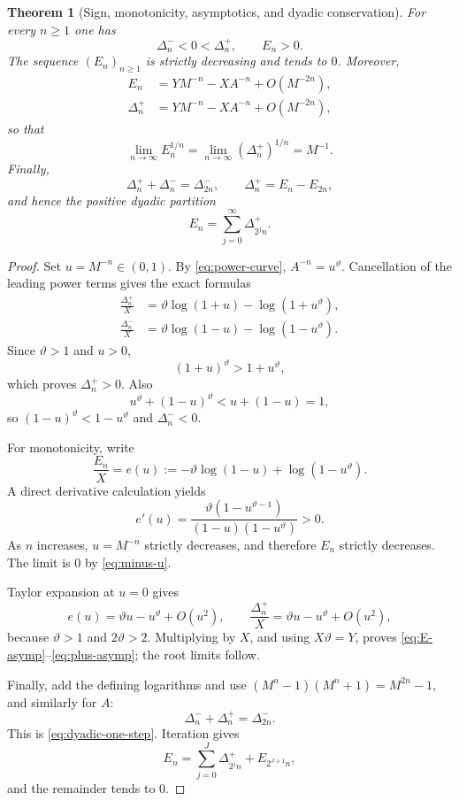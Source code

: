 \documentclass[11pt]{article}
\newtheorem{theorem}{Theorem}[section]
\theoremstyle{definition}
\newcommand{\vtheta}{\vartheta}
\begin{document}
\begin{theorem}[Sign, monotonicity, asymptotics, and dyadic conservation]
\label{thm:shifted-master}
For every $n\ge1$ one has
\begin{equation}\label{eq:signs}
 \Delta_n^-<0<\Delta_n^+,
 \qquad E_n>0.
\end{equation}
The sequence $(E_n)_{n\ge1}$ is strictly decreasing and tends to $0$.  Moreover,
\begin{align}
 E_n&=Y M^{-n}-X A^{-n}+O(M^{-2n}),\label{eq:E-asymp}\\
 \Delta_n^+&=Y M^{-n}-X A^{-n}+O(M^{-2n}),\label{eq:plus-asymp}
\end{align}
so that
\begin{equation}\label{eq:nth-root}
 \lim_{n\to\infty}E_n^{1/n}
 =\lim_{n\to\infty}(\Delta_n^+)^{1/n}=M^{-1}.
\end{equation}
Finally,
\begin{equation}\label{eq:dyadic-one-step}
 \Delta_n^++\Delta_n^-=\Delta_{2n}^-,
 \qquad
 \Delta_n^+=E_n-E_{2n},
\end{equation}
and hence the positive dyadic partition
\begin{equation}\label{eq:dyadic-sum}
 E_n=\sum_{j=0}^{\infty}\Delta_{2^j n}^+.
\end{equation}
\end{theorem}

\begin{proof}
Set $u=M^{-n}\in(0,1)$.  By \eqref{eq:power-curve}, $A^{-n}=u^{\vtheta}$.  Cancellation of
the leading power terms gives the exact formulas
\begin{align}
 \frac{\Delta_n^+}{X}
 &=\vtheta\log(1+u)-\log(1+u^{\vtheta}),\label{eq:plus-u}\\
 \frac{\Delta_n^-}{X}
 &=\vtheta\log(1-u)-\log(1-u^{\vtheta}).\label{eq:minus-u}
\end{align}
Since $\vtheta>1$ and $u>0$,
\[
 (1+u)^{\vtheta}>1+u^{\vtheta},
\]
which proves $\Delta_n^+>0$.  Also
\[
 u^{\vtheta}+(1-u)^{\vtheta}<u+(1-u)=1,
\]
so $(1-u)^{\vtheta}<1-u^{\vtheta}$ and $\Delta_n^-<0$.

For monotonicity, write
\[
 \frac{E_n}{X}=e(u):=-\vtheta\log(1-u)+\log(1-u^{\vtheta}).
\]
A direct derivative calculation yields
\begin{equation}\label{eq:e-derivative}
 e'(u)=
 \frac{\vtheta(1-u^{\vtheta-1})}{(1-u)(1-u^{\vtheta})}>0.
\end{equation}
As $n$ increases, $u=M^{-n}$ strictly decreases, and therefore $E_n$ strictly decreases.
The limit is $0$ by \eqref{eq:minus-u}.

Taylor expansion at $u=0$ gives
\[
 e(u)=\vtheta u-u^{\vtheta}+O(u^2),
 \qquad
 \frac{\Delta_n^+}{X}=\vtheta u-u^{\vtheta}+O(u^2),
\]
because $\vtheta>1$ and $2\vtheta>2$.  Multiplying by $X$, and using
$X\vtheta=Y$, proves \eqref{eq:E-asymp}--\eqref{eq:plus-asymp}; the root limits follow.

Finally, add the defining logarithms and use
$(M^n-1)(M^n+1)=M^{2n}-1$, and similarly for $A$:
\[
 \Delta_n^-+\Delta_n^+=\Delta_{2n}^-.
\]
This is \eqref{eq:dyadic-one-step}.  Iteration gives
\[
 E_n=\sum_{j=0}^{J}\Delta_{2^jn}^++E_{2^{J+1}n},
\]
and the remainder tends to $0$.
\end{proof}
\end{document}
